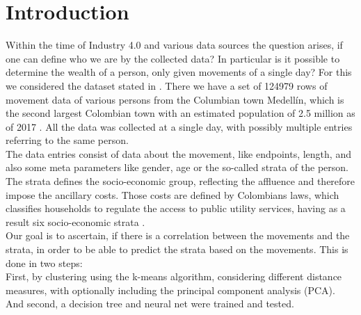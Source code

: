 \section{Introduction} \label{sec: introduction}
	Within the time of Industry 4.0 and various data sources the question arises, if one can define who we are by the collected data? In particular is it possible to determine the wealth of a person, only given movements of a single day?
	For this we considered the dataset stated in \cite{rich_do_not_rise_early}. There we have a set of 124979 rows of movement data of various persons from the Columbian town Medellín, which is the second largest Colombian town with an estimated population of 2.5 million as of 2017 \cite{population_number} . All the data was collected at a single day, with possibly multiple entries referring to the same person.\\
	The data entries consist of data about the movement, like endpoints, length, and also some meta parameters like gender, age or the so-called strata of the person. The strata defines the socio-economic group, reflecting the affluence and therefore impose the ancillary costs. Those costs are defined by Colombians laws, which classifies households to regulate the access to public utility services, having as a result six socio-economic strata \cite{rich_do_not_rise_early}.\\
	Our goal is to ascertain, if there is a correlation between the movements and the strata, in order to be able to predict the strata based on the movements. This is done in two steps:\\
	First, by clustering using the k-means algorithm, considering different distance measures, with optionally including the principal component analysis (PCA).\\
	And second, a decision tree and neural net were trained and tested.